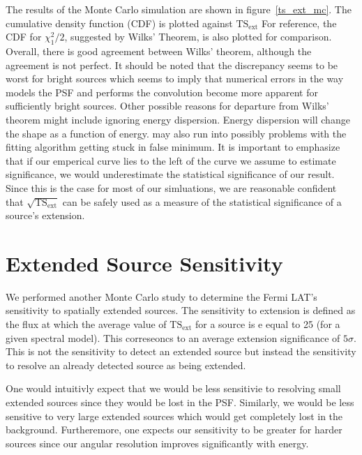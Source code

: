 \documentclass[preprint]{aastex}
\newcommand{\tsext}{{\ensuremath{\text{TS}_\text{ext}}}\xspace}
\newcommand{\pointlike}{\text{\em pointlike}\xspace}
\begin{document}
The results of the Monte Carlo simulation are shown in
figure~\ref{ts_ext_mc}.  The cumulative density function (CDF) is plotted
against $\tsext$ For reference, the CDF for $\chi^2_1/2$,
suggested by Wilks' Theorem, is also plotted for comparison. Overall,
there is good agreement between Wilks' theorem, although the agreement is
not perfect.  It should be noted that the discrepancy seems to be worst
for bright sources which seems to imply that numerical errors in the
way \pointlike models the PSF and performs the convolution become more
apparent for sufficiently bright sources.  Other possible reasons for
departure from Wilks' theorem might include \pointlike ignoring energy
dispersion. Energy dispersion will change the shape as a function of
energy. \pointlike may also run into possibly problems with the fitting
algorithm getting stuck in false minimum. It is important to emphasize
that if
our emperical curve lies to the left of the curve we assume to estimate
significance, we would underestimate the statistical significance of
our result. Since this is the case for most of our simluations, we are
reasonable confident that $\sqrt{\tsext}$ can be safely
used as a measure of the statistical significance of a source's extension.

\section{Extended Source Sensitivity}\label{extension_sensitivity}

We performed another Monte Carlo study to determine the Fermi LAT's
sensitivity to spatially extended sources. The sensitivity to extension
is defined as the flux at which 
the average value of $\tsext$ for a source is 
e equal to 25 (for a given spectral model). This correseoncs
to an average extension significance of $5\sigma$.  This is not the
sensitivity to detect an extended source but instead the sensitivity to
resolve an already detected source as being extended.  

One would intuitivly expect that we would be less sensitivie to resolving
small extended sources since they would be lost in the PSF.  Similarly,
we would be less sensitive to very large extended sources which would
get completely lost in the background. Furtheremore, one expects our
sensitivity to be greater for harder sources since our angular resolution
improves significantly with energy.
\end{document}
